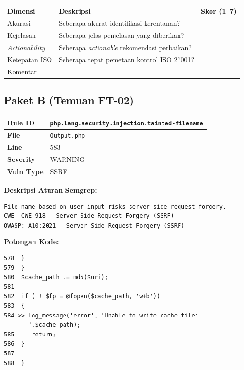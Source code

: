 \begin{center}
\renewcommand{\arraystretch}{1.6}
\begin{tabular}{|l|p{7.5cm}|c|}
\hline
\textbf{Dimensi} & \textbf{Deskripsi} & \textbf{Skor (1--7)} \\
\hline
Akurasi & Seberapa akurat identifikasi kerentanan? & \\
\hline
Kejelasan & Seberapa jelas penjelasan yang diberikan? & \\
\hline
\textit{Actionability} & Seberapa \textit{actionable} rekomendasi perbaikan? & \\
\hline
Ketepatan ISO & Seberapa tepat pemetaan kontrol ISO 27001? & \\
\hline
\multicolumn{2}{|l|}{Komentar} & \\
\hline
\end{tabular}
\end{center}

\subsection*{Paket B (Temuan FT-02)}

\begin{center}
\renewcommand{\arraystretch}{1.3}
\begin{tabular}{|l|l|}
\hline
\textbf{Rule ID} &
  \texttt{php.lang.security.injection.tainted-filename} \\
\hline
\textbf{File} & \texttt{Output.php} \\
\hline
\textbf{Line} & 583 \\
\hline
\textbf{Severity} & WARNING \\
\hline
\textbf{Vuln Type} & SSRF \\
\hline
\end{tabular}
\end{center}

\textbf{Deskripsi Aturan Semgrep:}
\begin{small}
\begin{lstlisting}[style=promptstyle]
File name based on user input risks server-side request forgery.
CWE: CWE-918 - Server-Side Request Forgery (SSRF)
OWASP: A10:2021 - Server-Side Request Forgery (SSRF)
\end{lstlisting}
\end{small}

\textbf{Potongan Kode:}
\begin{small}
\begin{lstlisting}[style=promptstyle]
578  }
579  }
580  $cache_path .= md5($uri);
581
582  if ( ! $fp = @fopen($cache_path, 'w+b'))
583  {
584 >> log_message('error', 'Unable to write cache file: 
       '.$cache_path);
585     return;
586  }
587
588  }
\end{lstlisting}
\end{small}

